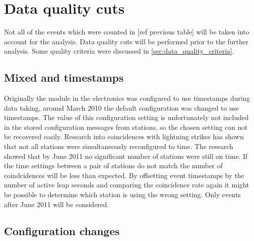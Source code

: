 \section{Data quality cuts}

Not all of the events which were counted in [ref previous table] will be taken into account for the analysis. Data quality cuts will be performed prior to the further analysis. Some quality criteria were discussed in \cref{sec:data_quality_criteria}.


\subsection{Mixed \utc and \gps timestamps}

Originally the \gps module in the \hisparc electronics was configured to use \utc timestamps during data taking, around March 2010 the default configuration was changed to use \gps timestamps. The value of this configuration setting is unfortunately not included in the stored configuration messages from stations, so the chosen setting can not be recovered easily. Research into coincidences with lightning strikes has shown that not all \hisparc stations were simultaneously reconfigured to \gps time. The research showed that by June 2011 no significant number of stations were still on \utc time. If the time settings between a pair of stations do not match the number of coindcidences will be less than expected. By offsetting event timestamps by the number of active leap seconds and comparing the coincidence rate again it might be possible to determine which station is using the wrong setting. Only events after June 2011 will be considered.


\subsection{Configuration changes}

